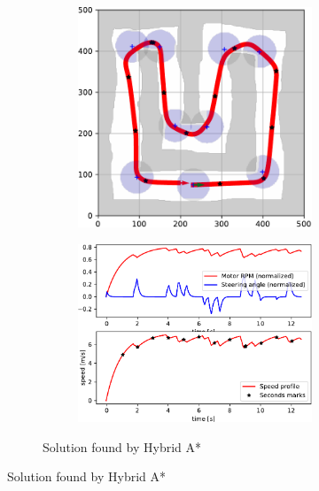 \begin{figure}[!tbp]%
	\centering

	\begin{subfigure}[t]{\textwidth}
		\begin{subfigure}[c]{0.54\textwidth}
			\includegraphics[width=\textwidth]{../img/experiments/u-hybrid_astar-trajectory}
		\end{subfigure}
		\hfill
		\begin{subfigure}[c]{0.45\textwidth}
			\includegraphics[width=\textwidth]{../img/experiments/u-hybrid_astar-actuators}
		\end{subfigure}	
		\caption{Solution found by Hybrid A*}
		\label{fig:u-hybrid_astar}
	\end{subfigure}


\end{figure}
